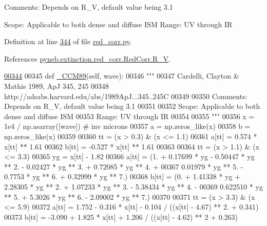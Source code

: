 \begin{DoxyVerb}
\begin{DoxyVerb}
Comments: Depends on R_V, default value being 3.1

Scope: Applicable to both dense and diffuse ISM
Range: UV through IR\end{DoxyVerb}
 

Definition at line \hyperlink{red__corr_8py_source_l00344}{344} of file \hyperlink{red__corr_8py_source}{red\-\_\-corr.\-py}.



References \hyperlink{red__corr_8py_source_l00204}{pyneb.\-extinction.\-red\-\_\-corr.\-Red\-Corr.\-R\-\_\-\-V}.


\begin{DoxyCode}
\hypertarget{classpyneb_1_1extinction_1_1red__corr_1_1_red_corr_l00344}{}\hyperlink{classpyneb_1_1extinction_1_1red__corr_1_1_red_corr_a0e1f547dbed4401b9c3d34658db9aaf7}{00344} 
00345     \textcolor{keyword}{def }\hyperlink{classpyneb_1_1extinction_1_1red__corr_1_1_red_corr_a0e1f547dbed4401b9c3d34658db9aaf7}{\_CCM89}(self, wave):
00346         \textcolor{stringliteral}{"""}
00347 \textcolor{stringliteral}{        Cardelli, Clayton & Mathis 1989, ApJ 345, 245}
00348 \textcolor{stringliteral}{        http://adsabs.harvard.edu/abs/1989ApJ...345..245C}
00349 \textcolor{stringliteral}{}
00350 \textcolor{stringliteral}{        Comments: Depends on R\_V, default value being 3.1}
00351 \textcolor{stringliteral}{}
00352 \textcolor{stringliteral}{        Scope: Applicable to both dense and diffuse ISM}
00353 \textcolor{stringliteral}{        Range: UV through IR}
00354 \textcolor{stringliteral}{        }
00355 \textcolor{stringliteral}{        """}
00356         x = 1e4 / np.asarray([wave]) \textcolor{comment}{# inv microns}
00357         a = np.zeros\_like(x)
00358         b = np.zeros\_like(x)
00359         
00360         tt = (x > 0.3) & (x <= 1.1)
00361         a[tt] = 0.574 * x[tt] ** 1.61 
00362         b[tt] = -0.527 * x[tt] ** 1.61
00363     
00364         tt = (x > 1.1) & (x <= 3.3)
00365         yg = x[tt] - 1.82
00366         a[tt] = (1. + 0.17699 * yg - 0.50447 * yg ** 2. - 0.02427 * yg ** 3. + 0.72085 * yg ** 4. + 
00367                  0.01979 * yg ** 5. - 0.7753 * yg ** 6. + 0.32999 * yg ** 7.)
00368         b[tt] = (0. + 1.41338 * yg + 2.28305 * yg ** 2. + 1.07233 * yg ** 3. - 5.38434 * yg ** 4. - 
00369                  0.622510 * yg ** 5. + 5.3026 * yg ** 6. - 2.09002 * yg ** 7.)
00370         
00371         tt = (x > 3.3) & (x <= 5.9)
00372         a[tt] = 1.752 - 0.316 * x[tt] - 0.104 / ((x[tt] - 4.67) ** 2. + 0.341)
00373         b[tt] = -3.090 + 1.825 * x[tt] + 1.206 / ((x[tt] - 4.62) ** 2 + 0.263)

\end{DoxyCode}
\end{DoxyVerb}
